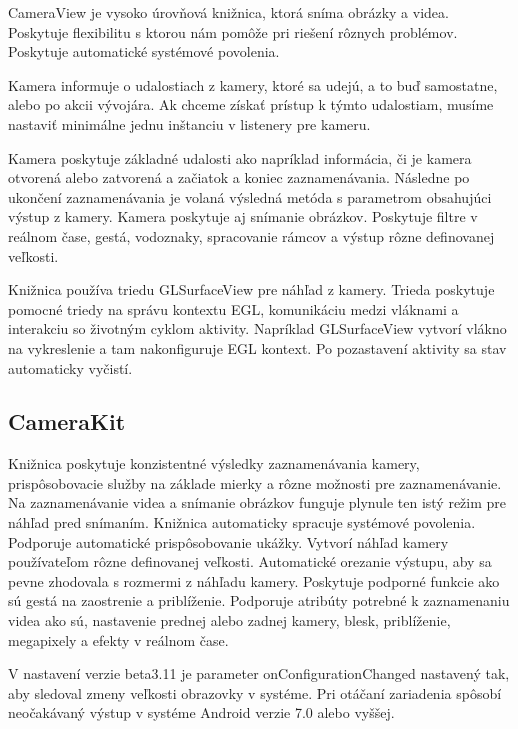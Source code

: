 \documentclass[12pt, oneside]{book}
\begin{document}
\hspace{15pt} CameraView je vysoko úrovňová knižnica, ktorá sníma obrázky a videa. Poskytuje flexibilitu s ktorou nám pomôže pri riešení rôznych problémov. Poskytuje automatické systémové povolenia.

Kamera informuje o udalostiach z kamery, ktoré sa udejú, a to buď samostatne, alebo po akcii vývojára. Ak chceme získať prístup k týmto udalostiam, musíme nastaviť minimálne jednu inštanciu v listenery pre kameru.

Kamera poskytuje základné udalosti ako napríklad informácia, či je kamera otvorená alebo zatvorená a začiatok a koniec zaznamenávania. Následne po ukončení zaznamenávania je volaná výsledná metóda s parametrom obsahujúci výstup z kamery. Kamera poskytuje aj snímanie obrázkov. Poskytuje filtre v reálnom čase, gestá, vodoznaky, spracovanie rámcov a výstup rôzne definovanej veľkosti. 

Knižnica používa triedu GLSurfaceView pre náhľad z kamery. Trieda poskytuje pomocné triedy na správu kontextu EGL, komunikáciu medzi vláknami a interakciu so životným cyklom aktivity. Napríklad GLSurfaceView vytvorí vlákno na vykreslenie a tam nakonfiguruje EGL kontext. Po pozastavení aktivity sa stav automaticky vyčistí.

\subsection{CameraKit}

\hspace{15pt} Knižnica poskytuje konzistentné výsledky zaznamenávania kamery, prispôsobovacie služby na základe mierky a rôzne možnosti pre zaznamenávanie. Na zaznamenávanie videa a snímanie obrázkov funguje plynule ten istý režim pre náhľad pred snímaním. Knižnica automaticky spracuje systémové povolenia. Podporuje automatické prispôsobovanie ukážky. Vytvorí náhľad kamery používateľom rôzne definovanej veľkosti. Automatické orezanie výstupu, aby sa pevne zhodovala s rozmermi z náhľadu kamery. Poskytuje podporné funkcie ako sú gestá na zaostrenie a priblíženie. Podporuje atribúty potrebné k zaznamenaniu videa ako sú, nastavenie prednej alebo zadnej kamery, blesk, priblíženie, megapixely a efekty v reálnom čase. 

V nastavení verzie beta3.11 je parameter onConfigurationChanged nastavený tak, aby sledoval zmeny veľkosti obrazovky v systéme. Pri otáčaní zariadenia spôsobí neočakávaný výstup v systéme Android verzie 7.0 alebo vyššej.
\end{document}
